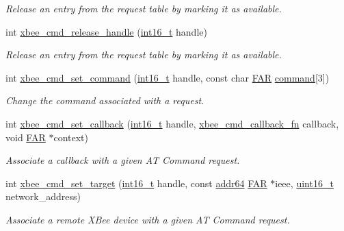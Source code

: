 \begin{DoxyCompactItemize}
\begin{DoxyCompactList}\small\item\em Release an entry from the request table by marking it as available. \end{DoxyCompactList}\item 
int \hyperlink{group__xbee__atcmd_ga91641619ae34da34615193962ffd1525}{xbee\-\_\-cmd\-\_\-release\-\_\-handle} (\hyperlink{group__hal_ga2140805d08462d474b82ddc8d1c2f3e6}{int16\-\_\-t} handle)
\begin{DoxyCompactList}\small\item\em Release an entry from the request table by marking it as available. \end{DoxyCompactList}\item 
int \hyperlink{group__xbee__atcmd_ga06181e54a87d90c30108360d6b433323}{xbee\-\_\-cmd\-\_\-set\-\_\-command} (\hyperlink{group__hal_ga2140805d08462d474b82ddc8d1c2f3e6}{int16\-\_\-t} handle, const char \hyperlink{group__hal_gaef060b3456fdcc093a7210a762d5f2ed}{F\-A\-R} \hyperlink{group__xbee__atcmd_ga1a5aaa930940857f68f245eeb89506b5}{command}\mbox{[}3\mbox{]})
\begin{DoxyCompactList}\small\item\em Change the command associated with a request. \end{DoxyCompactList}\item 
int \hyperlink{group__xbee__atcmd_ga0a5d2e2e87743061c46abd53e379e014}{xbee\-\_\-cmd\-\_\-set\-\_\-callback} (\hyperlink{group__hal_ga2140805d08462d474b82ddc8d1c2f3e6}{int16\-\_\-t} handle, \hyperlink{group__xbee__atcmd_ga9c6cda2f2b7450e8ef2f6b32d9fdcb12}{xbee\-\_\-cmd\-\_\-callback\-\_\-fn} callback, void \hyperlink{group__hal_gaef060b3456fdcc093a7210a762d5f2ed}{F\-A\-R} $\ast$context)
\begin{DoxyCompactList}\small\item\em Associate a callback with a given A\-T Command request. \end{DoxyCompactList}\item 
int \hyperlink{group__xbee__atcmd_gae478cb2ea9bb07ade86009a65e6d121f}{xbee\-\_\-cmd\-\_\-set\-\_\-target} (\hyperlink{group__hal_ga2140805d08462d474b82ddc8d1c2f3e6}{int16\-\_\-t} handle, const \hyperlink{unionaddr64}{addr64} \hyperlink{group__hal_gaef060b3456fdcc093a7210a762d5f2ed}{F\-A\-R} $\ast$ieee, \hyperlink{group__hal_ga5a8b2dc9e45a9ee81a94ef304fb62505}{uint16\-\_\-t} network\-\_\-address)
\begin{DoxyCompactList}\small\item\em Associate a remote X\-Bee device with a given A\-T Command request. \end{DoxyCompactList}\item 

\end{DoxyCompactItemize}
